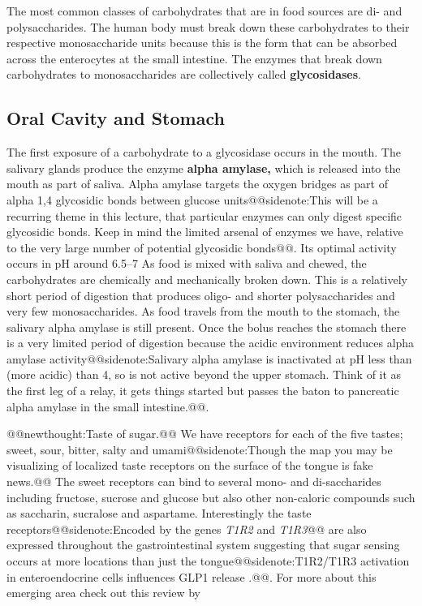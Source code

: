 \documentclass{tufte-handout}
\makeatletter
\def\newthought#1{@@newthought:#1@@}
\def\sidenote#1{@@sidenote:#1@@}
\makeatother
\begin{document}
The most common classes of carbohydrates that are in food sources are di- and polysaccharides. The human body must break down these carbohydrates to their respective monosaccharide units because this is the form that can be absorbed across the enterocytes at the small intestine. The enzymes that break down carbohydrates to monosaccharides are collectively called \textbf{glycosidases}.

\subsection{Oral Cavity and Stomach}

The first exposure of a carbohydrate to a glycosidase occurs in the mouth. The salivary glands produce the enzyme \textbf{alpha amylase,} which is released into the mouth as part of saliva. Alpha amylase targets the oxygen bridges as part of alpha 1,4 glycosidic bonds between glucose units\sidenote{This will be a recurring theme in this lecture, that particular enzymes can only digest specific glycosidic bonds.  Keep in mind the limited arsenal of enzymes we have, relative to the very large number of potential glycosidic bonds}.  Its optimal activity occurs in pH around 6.5--7 As food is mixed with saliva and chewed, the carbohydrates are chemically and mechanically broken down. This is a relatively short period of digestion that produces oligo- and shorter polysaccharides and very few monosaccharides. As food travels from the mouth to the stomach, the salivary alpha amylase is still present. Once the bolus reaches the stomach there is a very limited period of digestion because the acidic environment reduces alpha amylase activity\sidenote{Salivary alpha amylase is inactivated at pH less than (more acidic) than 4, so is not active beyond the upper stomach.  Think of it as the first leg of a relay, it gets things started but passes the baton to pancreatic alpha amylase in the small intestine.}.

\newthought{Taste of sugar.}  We have receptors for each of the five tastes; sweet, sour, bitter, salty and umami\sidenote{Though the map you may be visualizing of localized taste receptors on the surface of the tongue is fake news.}  The sweet receptors can bind to several mono- and di-saccharides including fructose, sucrose and glucose but also other non-caloric compounds such as saccharin, sucralose and aspartame.  Interestingly the taste receptors\sidenote{Encoded by the genes \textit{T1R2} and \textit{T1R3}} are also expressed throughout the gastrointestinal system suggesting that sugar sensing occurs at more locations than just the tongue\sidenote{T1R2/T1R3 activation in enteroendocrine cells influences GLP1 release \citep{jangGutexpressedGustducinTaste2007}.}.  For more about this emerging area check out this review by \citet{Janssen2013}
\end{document}

